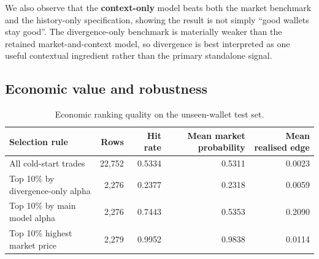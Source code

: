 \documentclass[11pt,a4paper]{article}
\newcommand{\edit}[1]{#1}
\newcommand{\ColdAllRows}{\edit{22,752}}
\newcommand{\ColdAllEdge}{\edit{0.0023}}
\newcommand{\ColdAllHit}{\edit{0.5334}}
\newcommand{\ColdAllProb}{\edit{0.5311}}
\newcommand{\DivTopRows}{\edit{2,276}}
\newcommand{\DivTopEdge}{\edit{0.0059}}
\newcommand{\DivTopHit}{\edit{0.2377}}
\newcommand{\DivTopProb}{\edit{0.2318}}
\newcommand{\MainTopRows}{\edit{2,276}}
\newcommand{\MainTopEdge}{\edit{0.2090}}
\newcommand{\MainTopHit}{\edit{0.7443}}
\newcommand{\MainTopProb}{\edit{0.5353}}
\newcommand{\PriceTopRows}{\edit{2,279}}
\newcommand{\PriceTopEdge}{\edit{0.0114}}
\newcommand{\PriceTopHit}{\edit{0.9952}}
\newcommand{\PriceTopProb}{\edit{0.9838}}
\begin{document}
We also observe that the \textbf{context-only} model beats both the market benchmark and the history-only specification, showing the result is not simply ``good wallets stay good''. The divergence-only benchmark is materially weaker than the retained market-and-context model, so divergence is best interpreted as one useful contextual ingredient rather than the primary standalone signal.


\subsection{Economic value and robustness}

\vspace{-1em}
\begin{table}[H]
\centering
\small
\begin{tabular}{lrrrr}
\toprule
Selection rule & Rows & Hit rate & Mean market probability & Mean realised edge \\
\midrule
All cold-start trades & \ColdAllRows & \ColdAllHit & \ColdAllProb & \ColdAllEdge \\
Top 10\% by divergence-only alpha & \DivTopRows & \DivTopHit & \DivTopProb & \DivTopEdge \\
Top 10\% by main model alpha & \MainTopRows & \MainTopHit & \MainTopProb & \MainTopEdge \\
Top 10\% highest market price & \PriceTopRows & \PriceTopHit & \PriceTopProb & \PriceTopEdge \\
\bottomrule
\end{tabular}
\caption{Economic ranking quality on the unseen-wallet test set.}
\label{tab:ml_alpha}
\end{table}
\end{document}
